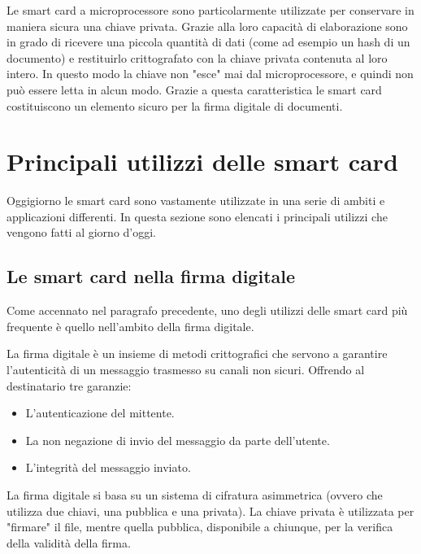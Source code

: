 Le smart card a microprocessore sono particolarmente utilizzate per conservare in maniera sicura una chiave privata. Grazie alla loro capacità di elaborazione sono in grado di ricevere una piccola quantità di dati (come ad esempio un hash di un documento) e restituirlo crittografato con la chiave privata contenuta al loro intero. In questo modo la chiave non "esce" mai dal microprocessore, e quindi non può essere letta in alcun modo. Grazie a questa caratteristica le smart card costituiscono un elemento sicuro per la firma digitale di documenti.
\cite{wiki_sc}

\section{Principali utilizzi delle smart card}
Oggigiorno le smart card sono vastamente utilizzate in una serie di ambiti e applicazioni differenti. In questa sezione sono elencati i principali utilizzi che vengono fatti al giorno d'oggi.
\subsection{Le smart card nella firma digitale}
Come accennato nel paragrafo precedente, uno degli utilizzi delle smart card più frequente è quello nell'ambito della firma digitale.

La firma digitale è un insieme di metodi crittografici che servono a garantire l'autenticità di un messaggio trasmesso su canali non sicuri. Offrendo al destinatario tre garanzie:
\begin{itemize}
    \item L'autenticazione del mittente.
    \item La non negazione di invio del messaggio da parte dell'utente.
    \item L'integrità del messaggio inviato.
\end{itemize}

La firma digitale si basa su un sistema di cifratura asimmetrica (ovvero che utilizza due chiavi, una pubblica e una privata). La chiave privata è utilizzata per "firmare" il file, mentre quella pubblica, disponibile a chiunque, per la verifica della validità della firma.

